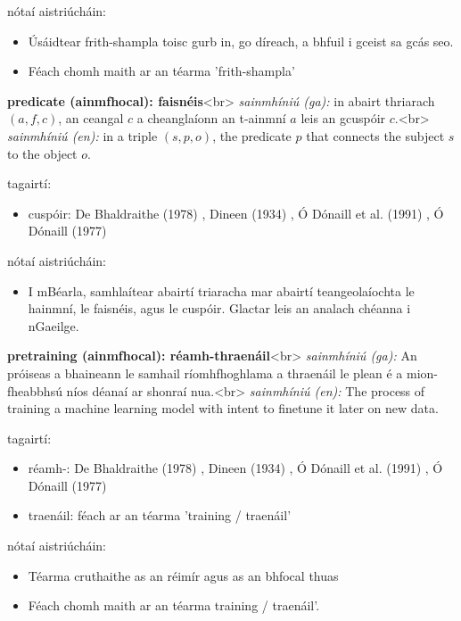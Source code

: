\documentclass{article}
\begin{document}
nótaí aistriúcháin:
\begin{itemize}
	\item Úsáidtear frith-shampla toisc gurb in, go díreach, a bhfuil i gceist sa gcás seo.
	\item Féach chomh maith ar an téarma 'frith-shampla'
\end{itemize}


\textbf{predicate (ainmfhocal): faisnéis}<br>
\textit{sainmhíniú (ga):} in abairt thriarach $(a,f,c)$, an ceangal $c$ a cheanglaíonn an t-ainmní $a$ leis an gcuspóir $c$.<br>
\textit{sainmhíniú (en):} in a triple $(s,p,o)$, the predicate $p$ that connects the subject $s$ to the object $o$.

tagairtí:
\begin{itemize}
	\item cuspóir: De Bhaldraithe (1978) \cite{de-bhaldraithe}, Dineen (1934) \cite{dineen}, Ó Dónaill et al. (1991) \cite{focloir-beag}, Ó Dónaill (1977) \cite{odonaill}
\end{itemize}

nótaí aistriúcháin:
\begin{itemize}
	\item I mBéarla, samhlaítear abairtí triaracha mar abairtí teangeolaíochta le hainmní, le faisnéis, agus le cuspóir. Glactar leis an analach chéanna i nGaeilge.
\end{itemize}


\textbf{pretraining (ainmfhocal): réamh-thraenáil}<br>
\textit{sainmhíniú (ga):} An próiseas a bhaineann le samhail ríomhfhoghlama a thraenáil le plean é a mion-fheabbhsú níos déanaí ar shonraí nua.<br>
\textit{sainmhíniú (en):} The process of training a machine learning model with intent to finetune it later on new data.

tagairtí:
\begin{itemize}
	\item réamh-: De Bhaldraithe (1978) \cite{de-bhaldraithe}, Dineen (1934) \cite{dineen}, Ó Dónaill et al. (1991) \cite{focloir-beag}, Ó Dónaill (1977) \cite{odonaill}
	\item traenáil: féach ar an téarma 'training / traenáil'
\end{itemize}

nótaí aistriúcháin:
\begin{itemize}
	\item Téarma cruthaithe as an réimír agus as an bhfocal thuas
	\item Féach chomh maith ar an téarma training / traenáil'.
\end{itemize}
\end{document}

